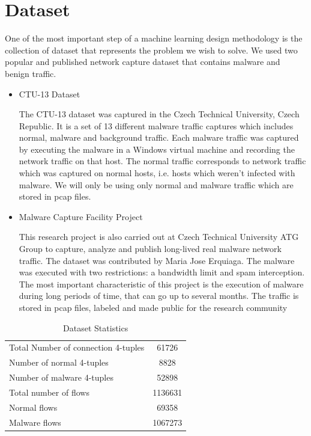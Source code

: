 \chapter{Dataset\label{chap:dataset}}

One of the most important step of a machine learning design methodology is the collection of dataset that represents the problem we wish to solve. We used two popular and published network capture dataset that contains malware and benign traffic.

\begin{itemize}
	\item CTU-13 Dataset~\cite{GarciaGSZ14}
	
	The CTU-13 dataset was captured in the Czech Technical University, Czech Republic. It is a set of 13 different malware traffic captures which includes normal, malware and background traffic. Each malware traffic was captured by executing the malware in a Windows virtual machine and recording the network traffic on that host. The normal traffic corresponds to network traffic which was captured on normal hosts, i.e. hosts which weren't infected with malware. We will only be using only normal and malware traffic which are stored in pcap files. 
	
	\item Malware Capture Facility Project~\cite{Erquiaga15}
	
	This research project is also carried out at Czech Technical University ATG Group to capture, analyze and publish long-lived real malware network traffic. The dataset was contributed by Maria Jose Erquiaga. The malware was executed with two restrictions: a bandwidth limit and spam interception. The most important characteristic of this project is the execution of malware during long periods of time, that can go up to several months. The traffic is stored in pcap files, labeled and made public for the research community
	
\end{itemize}

\begin{table}[!htb]
	\caption{Dataset Statistics\label{tab:1}}
	\begin{center}
		\begin{tabular}{p{}|c}\hline\hline
			Total Number of connection 4-tuples & 61726 \\
			Number of normal 4-tuples & 8828 \\
			Number of malware 4-tuples & 52898 \\
			Total number of flows & 1136631\\
			Normal flows & 69358\\
			Malware flows & 1067273\\
			\hline\hline
		\end{tabular}
	\end{center}
\end{table}

